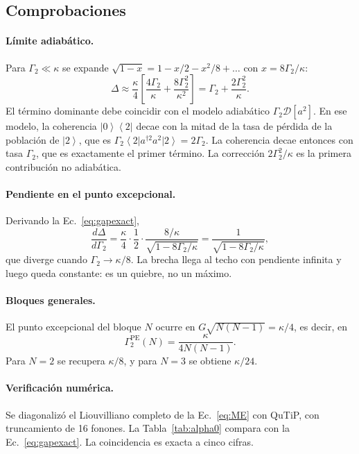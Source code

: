\documentclass[11pt]{report}
\newcommand{\ket}[1]{\left|#1\right\rangle}
\newcommand{\bra}[1]{\left\langle#1\right|}
\newcommand{\GG}{\Gamma_{2}}
\begin{document}
\subsection{Comprobaciones}

\paragraph{L\'imite adiab\'atico.} Para $\GG\ll\kappa$ se expande $\sqrt{1-x}=1-x/2-x^{2}/8+\ldots$ con $x=8\GG/\kappa$:
\begin{equation}
\Delta \approx \frac{\kappa}{4}\left[\frac{4\GG}{\kappa}+\frac{8\GG^{2}}{\kappa^{2}}\right] = \GG + \frac{2\GG^{2}}{\kappa} .
\end{equation}
El t\'ermino dominante debe coincidir con el modelo adiab\'atico $\GG\mathcal{D}[a^{2}]$. En ese modelo, la coherencia $\ket{0}\bra{2}$ decae con la mitad de la tasa de p\'erdida de la poblaci\'on de $\ket{2}$, que es $\GG\bra{2}a^{\dagger 2}a^{2}\ket{2}=2\GG$. La coherencia decae entonces con tasa $\GG$, que es exactamente el primer t\'ermino. La correcci\'on $2\GG^{2}/\kappa$ es la primera contribuci\'on no adiab\'atica.

\paragraph{Pendiente en el punto excepcional.} Derivando la Ec.~\eqref{eq:gapexact},
\begin{equation}
\frac{d\Delta}{d\GG} = \frac{\kappa}{4}\cdot\frac{1}{2}\cdot\frac{8/\kappa}{\sqrt{1-8\GG/\kappa}} = \frac{1}{\sqrt{1-8\GG/\kappa}},
\end{equation}
que diverge cuando $\GG\to\kappa/8$. La brecha llega al techo con pendiente infinita y luego queda constante: es un quiebre, no un m\'aximo.

\paragraph{Bloques generales.} El punto excepcional del bloque $N$ ocurre en $G\sqrt{N(N-1)}=\kappa/4$, es decir, en
\begin{equation}
\GG^{\mathrm{PE}}(N) = \frac{\kappa}{4N(N-1)} .
\end{equation}
Para $N=2$ se recupera $\kappa/8$, y para $N=3$ se obtiene $\kappa/24$.

\paragraph{Verificaci\'on num\'erica.} Se diagonaliz\'o el Liouvilliano completo de la Ec.~\eqref{eq:ME} con QuTiP, con truncamiento de 16 fonones. La Tabla~\ref{tab:alpha0} compara con la Ec.~\eqref{eq:gapexact}. La coincidencia es exacta a cinco cifras.
\end{document}
